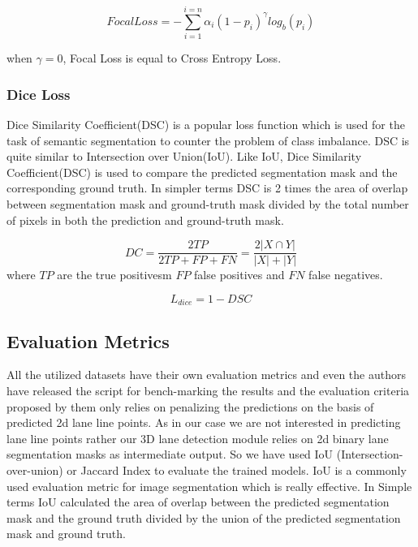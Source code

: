         \begin{equation}
            Focal Loss = - \sum^{i=n}_{i=1} \alpha_{i}(1-p_{i})^{\gamma} log_{b}(p_{i})
        \end{equation}
        
         when $\gamma = 0$, Focal Loss is equal to Cross Entropy Loss. 
        
        \subsubsection{Dice Loss}
        Dice Similarity Coefficient(DSC) is a popular loss function which is used for the task of semantic segmentation to counter the problem of class imbalance. DSC is quite similar to Intersection over Union(IoU). Like IoU, Dice Similarity Coefficient(DSC) is used to compare the predicted segmentation mask and the corresponding ground truth. In simpler terms DSC is 2 times the area of overlap  between segmentation mask and ground-truth mask divided by the total number of pixels in both the prediction and ground-truth mask.
        
        \begin{equation}
            DC = \frac{2TP}{2TP + FP + FN} = \frac{2|X \cap Y|}{|X| + |Y|}
        \end{equation}
    where $TP$ are the true positivesm $FP$ false positives and $FN$ false negatives.  
        
        \begin{equation}
            L_{dice} = 1 - DSC
        \end{equation}
        
        \subsection{Evaluation Metrics}
        All the utilized datasets have their own evaluation metrics and even the authors have released the script for bench-marking the results and the evaluation criteria proposed by them only relies on penalizing the predictions on the basis of predicted 2d lane line points. As in our case we are not interested in predicting lane line points rather our 3D lane detection module relies on 2d binary lane segmentation masks as intermediate output. So we have used IoU (Intersection-over-union) or Jaccard Index to evaluate the trained models. IoU is a commonly used evaluation metric for image segmentation which is really effective. In Simple terms IoU calculated the area of overlap between the predicted segmentation mask and the ground truth divided by the union of the predicted segmentation mask and ground truth.
        
